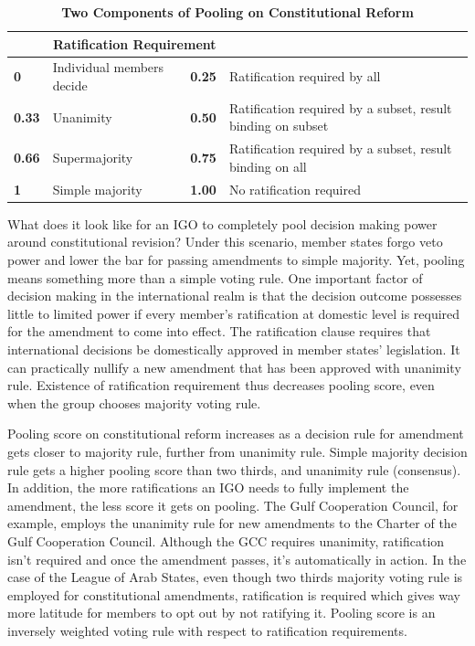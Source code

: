 \documentclass[12pt]{article}
\begin{document}
\begin{itemize}
\begin{table}[ht]
\centering
{}
\begin{tabular}{>{\bfseries}l l >{\bfseries}l p{7cm}}
\toprule\multicolumn{2}{c}{\textbf{Voting Rule}} & \multicolumn{2}{c}{\textbf{Ratification Requirement}} \\
\midrule
0     & Individual members decide             & 0.25  & Ratification required by all \\
0.33  & Unanimity                             & 0.50  & Ratification required by a subset, result binding on subset \\
0.66  & Supermajority                         & 0.75  & Ratification required by a subset, result binding on all \\
1     & Simple majority                       & 1.00  & No ratification required \\
\bottomrule
\end{tabular}
\caption{\textbf{Two Components of Pooling on Constitutional Reform}}
\label{fig:pooling-components}
\end{table}

What does it look like for an IGO to completely pool decision making power around constitutional revision? Under this scenario, member states forgo veto power and lower the bar for passing amendments to simple majority. Yet, pooling means something more than a simple voting rule. One important factor of decision making in the international realm is that the decision outcome possesses little to limited power if every member’s ratification at domestic level is required for the amendment to come into effect. The ratification clause requires that international decisions be domestically approved in member states’ legislation. It can practically nullify a new amendment that has been approved with unanimity rule. Existence of ratification requirement thus decreases pooling score, even when the group chooses majority voting rule. 

Pooling score on constitutional reform increases as a decision rule for amendment gets closer to majority rule, further from unanimity rule. Simple majority decision rule gets a higher pooling score than two thirds, and unanimity rule (consensus). In addition, the more ratifications an IGO needs to fully implement the amendment, the less score it gets on pooling. The Gulf Cooperation Council, for example, employs the unanimity rule for new amendments to the Charter of the Gulf Cooperation Council.  Although the GCC requires unanimity, ratification isn’t required and once the amendment passes, it’s automatically in action. In the case of the League of Arab States, even though two thirds majority voting rule is employed for constitutional amendments, ratification is required which gives way more latitude for members to opt out by not ratifying it. Pooling score is an inversely weighted voting rule with respect to ratification requirements.


\end{itemize}
\end{document}
